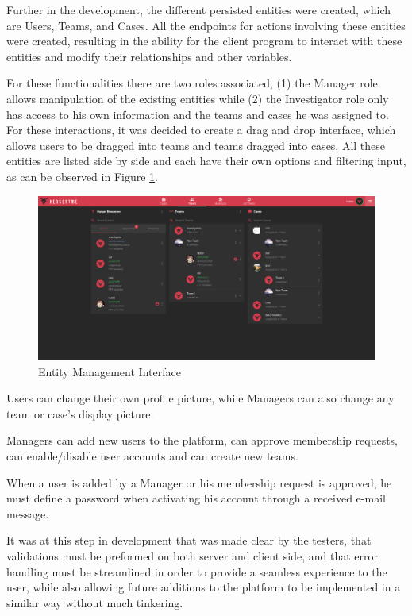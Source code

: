 Further in the development, the different persisted entities were created, which are Users, Teams, and Cases. All the endpoints for actions involving these 
entities were created, resulting in the ability for the client program to interact with these entities and modify their relationships and other variables.

For these functionalities there are two roles associated, (1) the Manager role allows manipulation of the existing entities while (2) the Investigator role only has access to his
own information and the teams and cases he was assigned to. For these interactions, it was decided to create a drag and drop interface, which allows users to be dragged into
teams and teams dragged into cases. All these entities are listed side by side and each have their own options and filtering input, as can be observed in Figure \ref{fig:users}.

\begin{figure}[ht]
 \centering
 \includegraphics[width=1\linewidth]{imgs/users.png}
 \caption{Entity Management Interface}
 \label{fig:users}
\end{figure}

Users can change their own profile picture, while Managers can also change any team or case's display picture.

Managers can add new users to the platform, can approve membership requests, can enable/disable user accounts and can create new teams.

When a user is added by a Manager or his membership request is approved, he must define a password when activating his account through a received e-mail message.

It was at this step in development that was made clear by the testers, that validations must be preformed on both server and client side, and that error handling must be streamlined
in order to provide a seamless experience to the user, while also allowing future additions to the platform to be implemented in a similar way without much tinkering.

